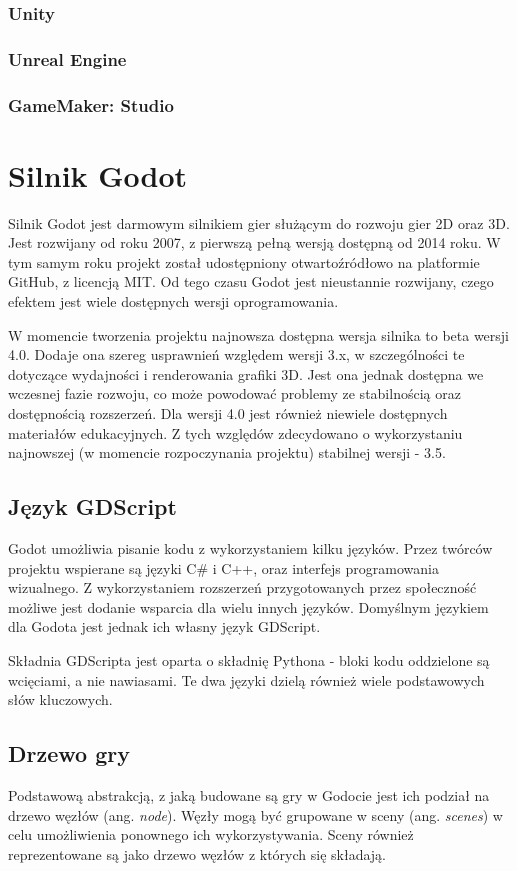 \subsubsection{Unity}
\subsubsection{Unreal Engine}
\subsubsection{GameMaker: Studio}

\section{Silnik Godot}
Silnik Godot\cite{godot_main} jest darmowym silnikiem gier służącym do rozwoju gier 2D oraz 3D. Jest rozwijany od roku 2007, z pierwszą pełną wersją dostępną od 2014 roku. W tym samym roku projekt został udostępniony otwartoźródłowo na platformie GitHub\cite{godot_github}, z licencją MIT. Od tego czasu Godot jest nieustannie rozwijany, czego efektem jest wiele dostępnych wersji oprogramowania. 

W momencie tworzenia projektu najnowsza dostępna wersja silnika to beta wersji 4.0. Dodaje ona szereg usprawnień względem wersji 3.x, w szczególności te dotyczące wydajności i renderowania grafiki 3D. Jest ona jednak dostępna we wczesnej fazie rozwoju, co może powodować problemy ze stabilnością oraz dostępnością rozszerzeń. Dla wersji 4.0 jest również niewiele dostępnych materiałów edukacyjnych. Z tych względów zdecydowano o wykorzystaniu najnowszej (w momencie rozpoczynania projektu) stabilnej wersji - 3.5\cite{godot_docs}. 

\subsection{Język GDScript}
Godot umożliwia pisanie kodu z wykorzystaniem kilku języków. Przez twórców projektu wspierane są języki C\# i C++, oraz interfejs programowania wizualnego. Z wykorzystaniem rozszerzeń przygotowanych przez społeczność możliwe jest dodanie wsparcia dla wielu innych języków. Domyślnym językiem dla Godota jest jednak ich własny język GDScript. 

Składnia GDScripta jest oparta o składnię Pythona - bloki kodu oddzielone są wcięciami, a nie nawiasami. Te dwa języki dzielą również wiele podstawowych słów kluczowych. 

\subsection{Drzewo gry}
Podstawową abstrakcją, z jaką budowane są gry w Godocie jest ich podział na drzewo węzłów (ang. \emph{node}). Węzły mogą być grupowane w sceny (ang. \emph{scenes}) w celu umożliwienia ponownego ich wykorzystywania. Sceny również reprezentowane są jako drzewo węzłów z których się składają. 

